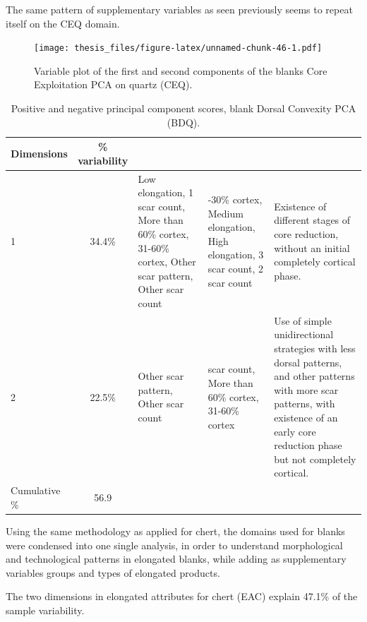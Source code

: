 \documentclass[12pt,twoside]{reedthesis}
\begin{document}
The same pattern of supplementary variables as seen previously seems to repeat itself on the CEQ domain.
\begin{figure}
\centering
\texttt{[image: thesis\_files/figure-latex/unnamed-chunk-46-1.pdf]}
\caption{\label{fig:unnamed-chunk-46}Variable plot of the first and second components of the blanks Core Exploitation PCA on quartz (CEQ).}
\end{figure}
\begin{table}

\caption{\label{tab:unnamed-chunk-47}Positive and negative principal component scores, blank Dorsal Convexity PCA (BDQ).}
\centering
\begin{tabular}[t]{lc>{\raggedright\arraybackslash}p{3cm}>{\raggedright\arraybackslash}p{3cm}>{\raggedright\arraybackslash}p{3cm}}
\toprule
\multicolumn{1}{c}{\textbf{Dimensions}} & \multicolumn{1}{c}{\textbf{\% variability}} & \multicolumn{1}{>{\centering\arraybackslash}p{3cm}}{\textbf{+}} & \multicolumn{1}{>{\centering\arraybackslash}p{3cm}}{\textbf{-}} & \multicolumn{1}{>{\centering\arraybackslash}p{3cm}}{\textbf{Interpretation}}\\
\midrule
1 & 34.4\% & Low elongation, 1 scar count, More than 60\% cortex, 31-60\% cortex, Other scar pattern, Other scar count & 1-30\% cortex, Medium elongation, High elongation, 3 scar count, 2 scar count & Existence of different stages of core reduction, without an initial completely cortical phase.\\
2 & 22.5\% & Other scar pattern, Other scar count & 1 scar count, More than 60\% cortex, 31-60\% cortex & Use of simple unidirectional strategies with less dorsal patterns, and other patterns with more scar patterns, with existence of an early core reduction phase but not completely cortical.\\
Cumulative \% & 56.9 &  &  & \\
\bottomrule
\end{tabular}
\end{table}
Using the same methodology as applied for chert, the domains used for blanks were condensed into one single analysis, in order to understand morphological and technological patterns in elongated blanks, while adding as supplementary variables groups and types of elongated products.

The two dimensions in elongated attributes for chert (EAC) explain 47.1\% of the sample variability.
\end{document}
